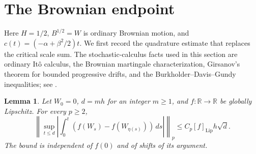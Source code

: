 \documentclass[11pt]{article}
\newtheorem{lemma}[theorem]{Lemma}
\theoremstyle{remark}
\newcommand{\R}{\mathbb R}
\begin{document}
\section{The Brownian endpoint}\label{sec:brownian}

Here \(H=1/2\), \(B^{1/2}=W\) is ordinary Brownian motion, and
\(c(t)=(-\alpha+\beta^2/2)t\).
We first record the quadrature estimate that replaces the critical scale
sum. The stochastic-calculus facts used in this section are ordinary
It\^o calculus, the Brownian martingale characterization, Girsanov's
theorem for bounded progressive drifts, and the
Burkholder--Davis--Gundy inequalities; see
\cite[Theorems 7.1.1, 7.2.1, 7.5.1 and 7.7.1]{Chafai}.

\begin{lemma}\label{lem:Brownian-quadrature}
Let \(W_0=0\), \(d=mh\) for an integer \(m\ge1\), and \(f:\R\to\R\)
be globally Lipschitz. For every \(p\ge2\),
\begin{equation}\label{eq:Brownian-quadrature}
 \left\|\sup_{t\le d}\left|
   \int_0^t(f(W_s)-f(W_{\eta(s)}))\,ds\right|\right\|_p
 \le C_p[f]_{\mathrm{Lip}}h\sqrt d .
\end{equation}
The bound is independent of \(f(0)\) and of shifts of its argument.
\end{lemma}
\end{document}
